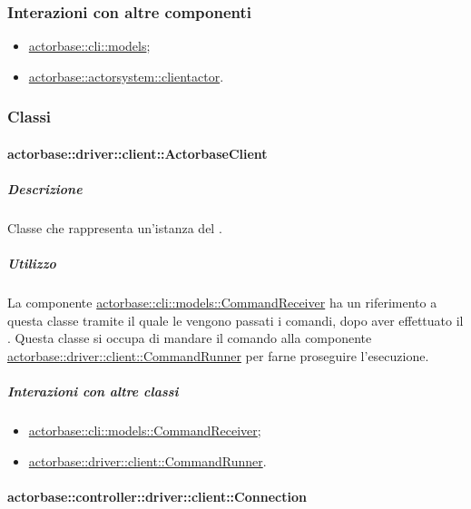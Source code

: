 \documentclass{scalatekids-article}
\begin{document}
\subsubsection{Interazioni con altre componenti}

\begin{itemize}
\item \hyperref[actorbase::cli::models]{actorbase::cli::models};
\item \hyperref[actorbase::actorsystem::clientactor]{actorbase::actorsystem::clientactor}.
\end{itemize}

\subsubsection{Classi}

\paragraph{actorbase::driver::client::ActorbaseClient}
\label{actorbase::driver::client::ActorbaseClient}

\subparagraph{Descrizione}

Classe che rappresenta un'istanza del .

\subparagraph{Utilizzo}

La componente \hyperref[actorbase::cli::models::CommandReceiver]{actorbase::cli::models::CommandReceiver}
ha un riferimento a questa classe tramite il quale le vengono passati i comandi, dopo aver
effettuato il . Questa classe si occupa di mandare il comando alla componente
\hyperref[actorbase::driver::client::CommandRunner]{actorbase::driver::client::CommandRunner} per farne
proseguire l'esecuzione.

\subparagraph{Interazioni con altre classi}

\begin{itemize}
\item \hyperref[actorbase::cli::models::CommandReceiver]{actorbase::cli::models::CommandReceiver};
\item \hyperref[actorbase::driver::client::CommandRunner]{actorbase::driver::client::CommandRunner}.
\end{itemize}

\paragraph{actorbase::controller::driver::client::Connection}
\end{document}
